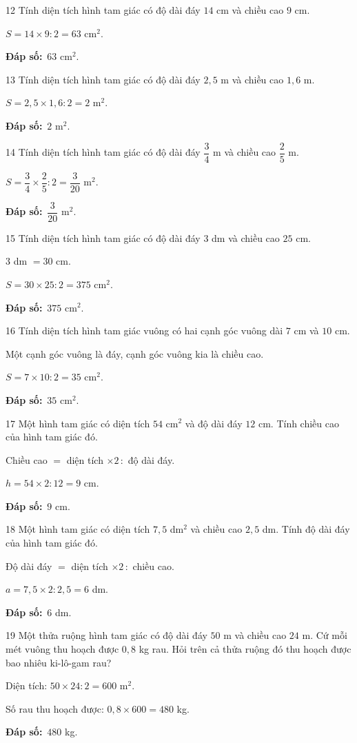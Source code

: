 \documentclass[11pt]{article}
\newif\ifsol \solfalse
\providecommand{\AnsWord}{Đáp số}
\newcommand{\dapso}[1]{\par\textbf{\AnsWord:}\ #1}
\newcommand{\probsol}[1]{%
  \begin{lrbox}{\solmeasure}\begin{minipage}{\dimexpr\linewidth-24pt\relax}#1\end{minipage}\end{lrbox}%
  \ifsol
    \begin{solbox}#1\end{solbox}%
  \else
    \setlength{\solht}{\dimexpr\ht\solmeasure+\dp\solmeasure+0.85cm\relax}%
    \ifdim\solht<1.35cm\setlength{\solht}{1.35cm}\fi
    \begin{tcolorbox}[colback=white,colframe=Line,boxrule=0.8pt,arc=5pt,
      left=8pt,right=8pt,top=4pt,bottom=4pt,height=\solht]{\footnotesize\color{Slate}\itshape\WorkWord}\end{tcolorbox}%
  \fi}
\newcommand{\gap}{\vspace{0.3cm}}
\def\WorkWord{Bài làm:}
\def\AnsWord{Đáp số}
\begin{document}
\gap
\begin{probbox}{12}{\relax}
Tính diện tích hình tam giác có độ dài đáy $14$ cm và chiều cao $9$ cm.
\end{probbox}
\probsol{
$S=14\times9:2=63$ cm$^2$.
\dapso{$63$ cm$^2$.}}
\gap
\begin{probbox}{13}{\relax}
Tính diện tích hình tam giác có độ dài đáy $2{,}5$ m và chiều cao $1{,}6$ m.
\end{probbox}
\probsol{
$S=2{,}5\times1{,}6:2=2$ m$^2$.
\dapso{$2$ m$^2$.}}
\gap
\begin{probbox}{14}{\relax}
Tính diện tích hình tam giác có độ dài đáy $\dfrac34$ m và chiều cao $\dfrac25$ m.
\end{probbox}
\probsol{
$S=\dfrac34\times\dfrac25:2=\dfrac3{20}$ m$^2$.
\dapso{$\dfrac3{20}$ m$^2$.}}
\gap
\begin{probbox}{15}{\relax}
Tính diện tích hình tam giác có độ dài đáy $3$ dm và chiều cao $25$ cm.
\end{probbox}
\probsol{
$3$ dm $=30$ cm.\par $S=30\times25:2=375$ cm$^2$.
\dapso{$375$ cm$^2$.}}
\gap
\begin{probbox}{16}{\relax}
Tính diện tích hình tam giác vuông có hai cạnh góc vuông dài $7$ cm và $10$ cm.
\end{probbox}
\probsol{
Một cạnh góc vuông là đáy, cạnh góc vuông kia là chiều cao.\par $S=7\times10:2=35$ cm$^2$.
\dapso{$35$ cm$^2$.}}
\gap
\begin{probbox}{17}{\relax}
Một hình tam giác có diện tích $54$ cm$^2$ và độ dài đáy $12$ cm. Tính chiều cao của hình tam giác đó.
\end{probbox}
\probsol{
Chiều cao $=$ diện tích $\times2\,:$ độ dài đáy.\par $h=54\times2:12=9$ cm.
\dapso{$9$ cm.}}
\gap
\begin{probbox}{18}{\relax}
Một hình tam giác có diện tích $7{,}5$ dm$^2$ và chiều cao $2{,}5$ dm. Tính độ dài đáy của hình tam giác đó.
\end{probbox}
\probsol{
Độ dài đáy $=$ diện tích $\times2\,:$ chiều cao.\par $a=7{,}5\times2:2{,}5=6$ dm.
\dapso{$6$ dm.}}
\gap
\begin{probbox}{19}{\relax}
Một thửa ruộng hình tam giác có độ dài đáy $50$ m và chiều cao $24$ m. Cứ mỗi mét vuông thu hoạch được $0{,}8$ kg rau. Hỏi trên cả thửa ruộng đó thu hoạch được bao nhiêu ki-lô-gam rau?
\end{probbox}
\probsol{
Diện tích: $50\times24:2=600$ m$^2$.\par Số rau thu hoạch được: $0{,}8\times600=480$ kg.
\dapso{$480$ kg.}}
\end{document}
